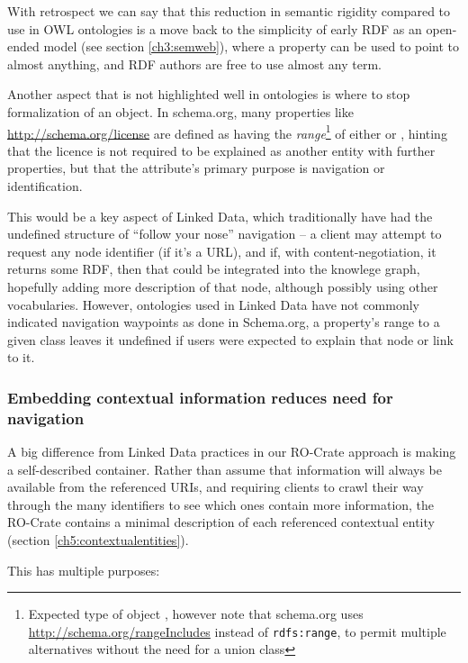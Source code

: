 With retrospect we can say that this reduction in semantic rigidity compared to use in OWL ontologies is a move back to the simplicity of early RDF as an open-ended model (see section \vref{ch3:semweb}), where a property can be used to point to almost anything, and RDF authors are free to use almost any term.

Another aspect that is not highlighted well in ontologies is where to stop formalization of an object.
In schema.org, many properties like \url{http://schema.org/license} are defined as having the \emph{range}\footnote{Expected type of object \cite{w3-rdf-schema}, however note that schema.org uses \url{http://schema.org/rangeIncludes} instead of \texttt{rdfs:range}, to permit multiple alternatives without the need for a union class} of either  or , hinting that the licence is not required to be explained as another entity with further properties, but that the attribute's primary purpose is navigation or identification. 

This would be a key aspect of Linked Data, which traditionally have had the undefined structure of ``follow your nose'' navigation -- a client may attempt to request any node identifier (if it's a URL), and if, with content-negotiation, it returns some RDF, then that could be integrated into the knowlege graph, hopefully adding more description of that node, although possibly using other vocabularies.
However, ontologies used in Linked Data have not commonly indicated navigation waypoints as done in Schema.org, a property's range to a given class leaves it undefined if users were expected to explain that node or link to it.


\subsubsection{Embedding contextual information reduces need for navigation}

A big difference from Linked Data practices in our RO-Crate approach is making a self-described container.
Rather than assume that information will always be available from the referenced URIs, and requiring clients to crawl their way through the many identifiers to see which ones contain more information, the RO-Crate contains a minimal description of each referenced contextual entity (section \vref{ch5:contextualentities}). 

This has multiple purposes:

